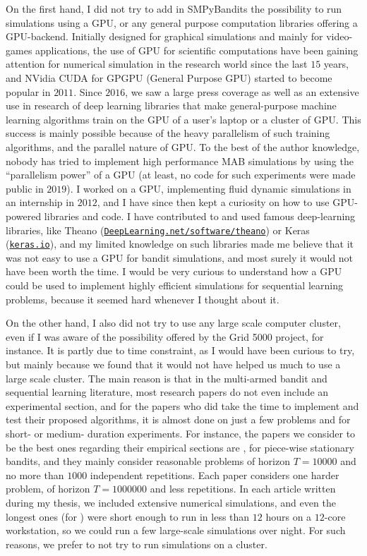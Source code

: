 On the first hand, I did not try to add in SMPyBandits the possibility to run simulations using a GPU, or any general purpose computation libraries offering a GPU-backend.
Initially designed for graphical simulations and mainly for video-games applications, the use of GPU for scientific computations have been gaining attention for numerical simulation in the research world since the last $15$ years, and NVidia CUDA for GPGPU (General Purpose GPU) started to become popular in $2011$.
Since $2016$, we saw a large press coverage as well as an extensive use in research of deep learning libraries that make general-purpose machine learning algorithms train on the GPU of a user's laptop or a cluster of GPU.
This success is mainly possible because of the heavy parallelism of such training algorithms, and the parallel nature of GPU.
To the best of the author knowledge, nobody has tried to implement high performance MAB simulations by using the ``parallelism power'' of a GPU (at least, no code for such experiments were made public in $2019$).
I worked on a GPU, implementing fluid dynamic simulations in an internship in $2012$, and I have since then kept a curiosity on how to use GPU-powered libraries and code.
I have contributed to and used famous deep-learning libraries, like Theano (\href{http://deeplearning.net/software/theano/}{\texttt{DeepLearning.net/software/theano}}) or Keras (\href{https://keras.io/}{\texttt{keras.io}}), and my limited knowledge on such libraries made me believe that it was not easy to use a GPU for bandit simulations, and most surely it would not have been worth the time.
I would be very curious to understand how a GPU could be used to implement highly efficient simulations for sequential learning problems, because it seemed hard whenever I thought about it.

On the other hand, I also did not try to use any large scale computer cluster, even if I was aware of the possibility offered by the Grid 5000 project, for instance.
It is partly due to time constraint, as I would have been curious to try, but mainly because we found that it would not have helped us much to use a large scale cluster.
The main reason is that in the multi-armed bandit and sequential learning literature, most research papers do not even include an experimental section, and for the papers who did take the time to implement and test their proposed algorithms, it is almost done on just a few problems and for short- or medium- duration experiments.
For instance, the papers we consider to be the best ones regarding their empirical sections are \cite{LiuLeeShroff17,CaoZhenKvetonXie18}, for piece-wise stationary bandits, and they mainly consider reasonable problems of horizon $T=10000$ and no more than $1000$ independent repetitions. Each paper considers one harder problem, of horizon $T=1000000$ and less repetitions.
%
In each article written during my thesis, we included extensive numerical simulations, and even the longest ones (for \cite{Besson2019GLRT}) were short enough to run in less than $12$ hours on a $12$-core workstation, so we could run a few large-scale simulations over night.
For such reasons, we prefer to not try to run simulations on a cluster.
